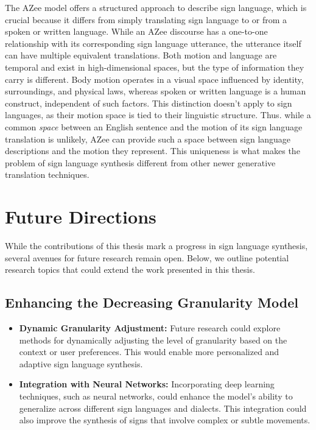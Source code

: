 \documentclass[../../main.tex]{subfiles}
\begin{document}
The AZee model offers a structured approach to describe sign language, which is crucial because it differs from simply translating sign language to or from a spoken or written language. While an AZee discourse has a one-to-one relationship with its corresponding sign language utterance, the utterance itself can have multiple equivalent translations. Both motion and language are temporal and exist in high-dimensional spaces, but the type of information they carry is different. Body motion operates in a visual space influenced by identity, surroundings, and physical laws, whereas spoken or written language is a human construct, independent of such factors. This distinction doesn't apply to sign languages, as their motion space is tied to their linguistic structure. Thus. while a common \emph{space} between an English sentence and the motion of its sign language translation is unlikely, AZee can provide such a space between sign language descriptions and the motion they represent. This uniqueness is what makes the problem of sign language synthesis different from other newer generative translation techniques.

\section{Future Directions}
\label{ch:conclusion:future}

While the contributions of this thesis mark a progress in sign language synthesis, several avenues for future research remain open. Below, we outline potential research topics that could extend the work presented in this thesis.

\subsection{Enhancing the Decreasing Granularity Model}
\label{ch:conclusion:future:granularity}

\begin{itemize}
    \item \textbf{Dynamic Granularity Adjustment:} Future research could explore methods for dynamically adjusting the level of granularity based on the context or user preferences. This would enable more personalized and adaptive sign language synthesis.
    
    \item \textbf{Integration with Neural Networks:} Incorporating deep learning techniques, such as neural networks, could enhance the model’s ability to generalize across different sign languages and dialects. This integration could also improve the synthesis of signs that involve complex or subtle movements.
\end{itemize}
\end{document}
